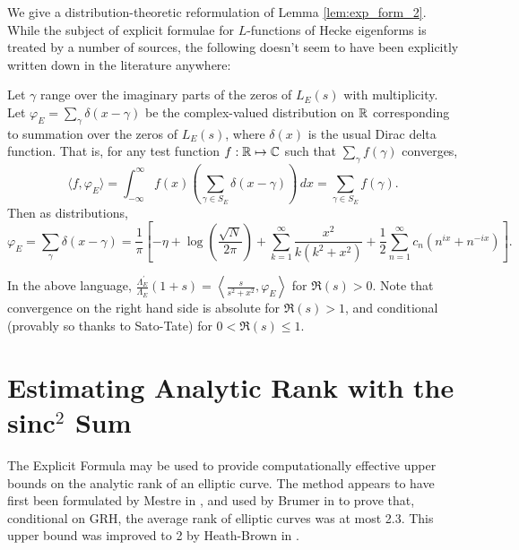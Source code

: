 \documentclass[10pt]{article}
\newcommand{\pr}{^{\prime}}
\newcommand{\Les}{L_E(s)}
\newcommand{\ldLam}[1]{\frac{\Lambda_E\pr}{\Lambda_E}\left(#1\right)}
\begin{document}
We give a distribution-theoretic reformulation of Lemma \ref{lem:exp_form_2}. While the subject of explicit formulae for $L$-functions of Hecke eigenforms is treated by a number of sources, the following doesn't seem to have been explicitly written down in the literature anywhere:
\begin{proposition}[S.]
Let $\gamma$ range over the imaginary parts of the zeros of $\Les$ with multiplicity. Let $\varphi_E = \sum_{\gamma} \delta(x-\gamma)$ be the complex-valued distribution on $\mathbb{R}$ corresponding to summation over the zeros of $L_E(s)$, where $\delta(x)$ is the usual Dirac delta function. That is, for any test function $f: \mathbb{R} \mapsto \mathbb{C}$ such that $\sum_{\gamma}f(\gamma)$ converges, 
\begin{equation}
\langle f,\varphi_E \rangle = \int_{-\infty}^{\infty} f(x)\left(\sum_{\gamma\in S_E} \delta(x-\gamma)\right) \, dx = \sum_{\gamma\in S_E} f(\gamma).
\end{equation}
Then as distributions,
\begin{equation}\label{eqn:exp_form_3}
\varphi_E = \sum_{\gamma} \delta(x-\gamma) = \frac{1}{\pi}\left[-\eta + \log\left(\frac{\sqrt{N}}{2\pi}\right) +\sum_{k=1}^{\infty} \frac{x^2}{k(k^2+x^2)} + \frac{1}{2}\sum_{n=1}^{\infty} c_n \left(n^{ix}+n^{-ix}\right) \right].
\end{equation}
\end{proposition}
In the above language, $\ldLam{1+s} = \left\langle \frac{s}{s^2+x^2},\varphi_E \right\rangle$ for $\Re(s) > 0$. Note that convergence on the right hand side is absolute for $\Re(s)>1$, and conditional (provably so thanks to Sato-Tate) for $0<\Re(s)\le 1$. \\

\newpage
\section{Estimating Analytic Rank with the sinc$^2$ Sum}

The Explicit Formula may be used to provide computationally effective upper bounds on the analytic rank of an elliptic curve. The method appears to have first been formulated by Mestre in \cite{Me-1986}, and used by Brumer in \cite{Bru-1992} to prove that, conditional on GRH, the average rank of elliptic curves was at most 2.3. This upper bound was improved to 2 by Heath-Brown in \cite{HeBr-2004}. \\
\end{document}
